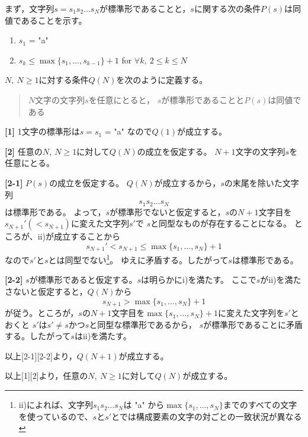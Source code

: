 \documentclass{article}
\makeatletter
\renewenvironment{proof}[1][\proofname]{\par
        \pushQED{\qed}
        \normalfont
        \topsep6\p@\@plus6\p@ \trivlist
        \item[\hskip\labelsep{\bfseries #1}\@addpunct{\bfseries}]\ignorespaces
    }{%
        \popQED\endtrivlist\@endpefalse
    }
\renewcommand{\proofname}{\underline{証明.}}
\makeatother
\begin{document}
まず，文字列$s = s_1 s_2 \dots s_N$が標準形であることと，$s$に関する次の条件$P(s)$は同値であることを示す。

\begin{enumerate}
    \renewcommand{\labelenumi}{\roman{enumi}).}
    \item $s_1$ = "a"
    \item $s_k \leq \max\{s_1, \dots, s_{k-1}\} + 1$ \quad for $\forall k,\ 2 \leq k \leq N$
\end{enumerate}

\begin{proof}
    $N,\ N \geq 1$に対する条件$Q(N)$を次のように定義する。
    \begin{quote}
        $N$文字の文字列$s$を任意にとると，
        $s$が標準形であることと$P(s)$は同値である
    \end{quote}

    \textbf{[1]}
    1文字の標準形は$s = s_1$ = "a" なので$Q(1)$が成立する。

    \textbf{[2]}
    任意の$N,\ N \geq 1$に対して$Q(N)$の成立を仮定する。
    $N+1$文字の文字列$s$を任意にとる。

    \leftskip=15pt
        \textbf{[2-1]}
        $P(s)$の成立を仮定する。
        $Q(N)$が成立するから，$s$の末尾を除いた文字列
        \begin{equation}
            s_1 s_2 \dots s_{N}
        \end{equation}
        は標準形である。
        よって，$s$が標準形でないと仮定すると，$s$の$N+1$文字目を$s_{N+1}' (< s_{N+1})$に変えた文字列$s'$で
        $s$と同型なものが存在することになる。
        ところが、ii)が成立することから
        \begin{equation}
            s_{N+1}' < s_{N+1} \leq \max\{s_1, \dots, s_N\} + 1
        \end{equation}
        なので$s'$と$s$とは同型でない\footnote{ii)によれば、文字列$s_1 s_2 \dots s_N$は "a" から$\max\{s_1,\dots,s_N\}$までのすべての文字を使っているので、$s$と$s'$とでは構成要素の文字の対ごとの一致状況が異なる}。
        ゆえに矛盾する。したがって$s$は標準形である。

        \textbf{[2-2]}
        $s$が標準形であると仮定する。$s$は明らかにi)を満たす。
        ここで$s$がii)を満たさないと仮定すると，$Q(N)$から
        \begin{equation}
            s_{N+1} > \max\{s_1, \dots, s_N\} + 1
        \end{equation}
        が従う。ところが，$s$の$N+1$文字目を$\max\{s_1, \dots, s_N\} + 1$に変えた文字列を$s'$とおくと
        $s'$は$s' \neq s$かつ$s$と同型な標準形であるから，
        $s$が標準形であることに矛盾する。したがって$s$はii)を満たす。

    \leftskip=0pt

    以上[2-1][2-2]より，$Q(N+1)$が成立する。

    以上[1][2]より，任意の$N,\ N \geq 1$に対して$Q(N)$が成立する。
\end{proof}
\end{document}
